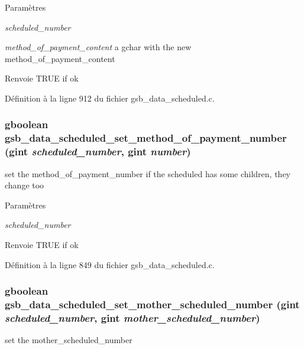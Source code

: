\begin{DoxyParams}{Paramètres}
\item[{\em scheduled\_\-number}]\item[{\em method\_\-of\_\-payment\_\-content}]a gchar with the new method\_\-of\_\-payment\_\-content\end{DoxyParams}
\begin{DoxyReturn}{Renvoie}
TRUE if ok 
\end{DoxyReturn}


Définition à la ligne 912 du fichier gsb\_\-data\_\-scheduled.c.

\subsubsection[{gsb\_\-data\_\-scheduled\_\-set\_\-method\_\-of\_\-payment\_\-number}]{\setlength{\rightskip}{0pt plus 5cm}gboolean gsb\_\-data\_\-scheduled\_\-set\_\-method\_\-of\_\-payment\_\-number (gint {\em scheduled\_\-number}, \/  gint {\em number})}\label{gsb__data__scheduled_8h_a8ab4146a9644d811614d40761cffb8ff}
set the method\_\-of\_\-payment\_\-number if the scheduled has some children, they change too


\begin{DoxyParams}{Paramètres}
\item[{\em scheduled\_\-number}]\item[{\em }]\end{DoxyParams}
\begin{DoxyReturn}{Renvoie}
TRUE if ok 
\end{DoxyReturn}


Définition à la ligne 849 du fichier gsb\_\-data\_\-scheduled.c.

\subsubsection[{gsb\_\-data\_\-scheduled\_\-set\_\-mother\_\-scheduled\_\-number}]{\setlength{\rightskip}{0pt plus 5cm}gboolean gsb\_\-data\_\-scheduled\_\-set\_\-mother\_\-scheduled\_\-number (gint {\em scheduled\_\-number}, \/  gint {\em mother\_\-scheduled\_\-number})}\label{gsb__data__scheduled_8h_a81e177057b8cee058231df2a82c98800}
set the mother\_\-scheduled\_\-number


